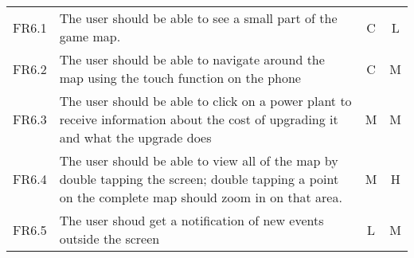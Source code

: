 \begin{longtable}{| c | p{8cm} | c | c |}
   	\rowcolor{Gray}   	
   	\multicolumn{4}{| l |}{6) GUI} \\ \hline

   	FR6.1 & The user should be able to see a small part of the game map. & C & L \\ \hline

   	FR6.2 & The user should be able to navigate around the map using the touch function on the phone & C & M \\ \hline

   	FR6.3 & The user should be able to click on a power plant to receive information about the cost of upgrading it and what the upgrade does & M & M \\ \hline

   	FR6.4 & The user should be able to view all of the map by double tapping the screen; double tapping a point on the complete map should zoom in on that area. & M & H \\ \hline

   	FR6.5 & The user shoud get a notification of new events outside the screen & L & M \\ \hline

	\hline
\end{longtable}
